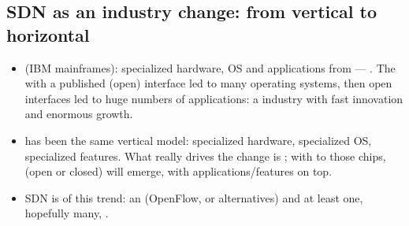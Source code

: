 \subsection{SDN as an industry change: from vertical to horizontal}
\begin{itemize}
\item {} (IBM mainframes): specialized hardware, OS and applications from  --- . The  with a published (open) interface led to many operating systems, then open interfaces led to huge numbers of applications: a  industry with fast innovation and enormous growth.
\item {} has been the same vertical model: specialized hardware, specialized OS, specialized features. What really drives the change is ; with  to those chips,  (open or closed) will emerge, with applications/features on top.
\item SDN is  of this trend: an  (OpenFlow, or alternatives) and at least one, hopefully many, .
\end{itemize}


